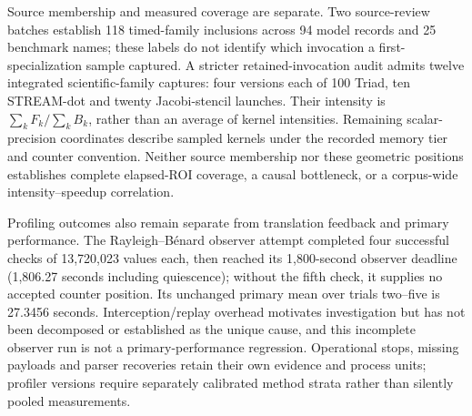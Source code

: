 Source membership and measured coverage are separate. Two source-review batches establish 118 timed-family inclusions across 94 model records and 25 benchmark names; these labels do not identify which invocation a first-specialization sample captured. A stricter retained-invocation audit admits twelve integrated scientific-family captures: four versions each of 100 Triad, ten STREAM-dot and twenty Jacobi-stencil launches. Their intensity is $\sum_k F_k/\sum_k B_k$, rather than an average of kernel intensities. Remaining scalar-precision coordinates describe sampled kernels under the recorded memory tier and counter convention. Neither source membership nor these geometric positions establishes complete elapsed-ROI coverage, a causal bottleneck, or a corpus-wide intensity--speedup correlation.

Profiling outcomes also remain separate from translation feedback and primary performance. The Rayleigh--B\'enard observer attempt completed four successful checks of 13,720,023 values each, then reached its 1,800-second observer deadline (1,806.27 seconds including quiescence); without the fifth check, it supplies no accepted counter position. Its unchanged primary mean over trials two--five is 27.3456 seconds. Interception/replay overhead motivates investigation but has not been decomposed or established as the unique cause, and this incomplete observer run is not a primary-performance regression. Operational stops, missing payloads and parser recoveries retain their own evidence and process units; profiler versions require separately calibrated method strata rather than silently pooled measurements.
